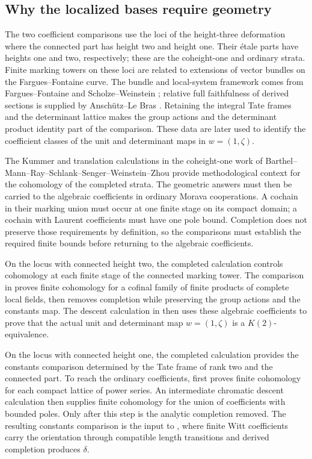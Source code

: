 \subsection{Why the localized bases require geometry}

The two coefficient comparisons use the loci of the height-three
deformation where the connected part has height two and height one.
Their \'etale parts have heights one and two, respectively; these are
the coheight-one and ordinary strata.  Finite marking towers on these
loci are related to extensions of vector bundles on the
Fargues--Fontaine curve.  The bundle and local-system framework
comes from Fargues--Fontaine and Scholze--Weinstein
\cite{FarguesFontaine,ScholzeWeinstein}; relative full faithfulness
of derived sections is supplied by Ansch\"utz--Le Bras
\cite[Corollary~3.11]{AnschuetzLeBrasFourier}.
Retaining the integral Tate frames and the determinant lattice makes
the group actions and the determinant product identity part of the
comparison.  These data are later used to identify the coefficient
classes of the unit and determinant maps in \(w=(1,\zeta)\).

The Kummer and translation calculations in the coheight-one work of
Barthel--Mann--Ray--Schlank--Senger--Weinstein--Zhou
\cite[Sections~3.3--3.6]{BMR} provide methodological context for
the cohomology of the completed strata.  The geometric answers must
then be carried to the algebraic coefficients in ordinary Morava
cooperations.
A cochain in their marking union must occur at one finite stage on
its compact domain; a cochain with Laurent coefficients must have
one pole bound.  Completion does not preserve those requirements by
definition, so the comparisons must establish the required finite
bounds before returning to the algebraic coefficients.

On the locus with connected height two, the completed calculation
controls cohomology at each finite stage of the connected marking tower.
The comparison in  proves finite cohomology
for a cofinal family of finite products of complete local fields, then
removes completion while preserving the group actions and the constants
map.  The descent calculation in  then uses these
algebraic coefficients to prove that the actual unit
and determinant map \(w=(1,\zeta)\) is a \(K(2)\)-equivalence.

On the locus with connected height one, the completed calculation
provides the constants comparison determined by the Tate frame of rank
two and the connected part.
To reach the ordinary coefficients,  first proves
finite cohomology for each compact lattice of power series.  An
intermediate chromatic descent calculation then supplies finite cohomology
for the union of coefficients with bounded poles.  Only after this step is
the analytic completion removed.  The resulting constants comparison
is the input to , where finite Witt
coefficients carry the orientation through compatible length transitions
and derived completion produces \(\delta\).

